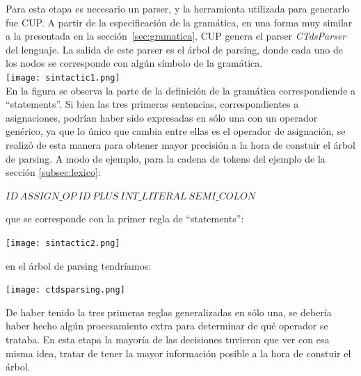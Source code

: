 \documentclass[11pt,a4paper]{article}
\begin{document}
Para esta etapa es necesario un parser, y la herramienta utilizada para generarlo fue CUP. A partir de la especificación de la gramática, en una forma muy similar a la presentada en la sección~\ref{sec:gramatica}, CUP genera el parser \textit{CTdsParser} del lenguaje. La salida de este parser es el árbol de parsing, donde cada uno de los nodos se corresponde con algún símbolo de la gramática.
\\

\texttt{[image: sintactic1.png]} \\ 

En la figura se observa la parte de la definición de la gramática correspondiende a ``statements''. Si bien las tres primeras sentencias, correspondientes a asignaciones, podrían haber sido expresadas en sólo una con un operador genérico, ya que lo único que cambia entre ellas es el operador de asignación, se realizó de esta manera para obtener mayor precisión a la hora de constuir el árbol de parsing. A modo de ejemplo, para la cadena de tokens del ejemplo de la sección \ref{subsec:lexico}:
\begin{center}
	$ID \ ASSIGN\_OP \ ID \ PLUS \ INT\_LITERAL \ SEMI\_COLON$
\end{center}
que se corresponde con la primer regla de ``statements'':	
\begin{center}
\texttt{[image: sintactic2.png]} \\
\end{center}
en el árbol de parsing tendríamos:
\\
\begin{center}
\texttt{[image: ctdsparsing.png]} \\
\end{center}

De haber tenido la tres primeras reglas generalizadas en sólo una, se debería haber hecho algún procesamiento extra para determinar de qué operador se trataba. En esta etapa la mayoría de las decisiones tuvieron que ver con esa misma idea, tratar de tener la mayor información posible a la hora de constuir el árbol.
\end{document}
